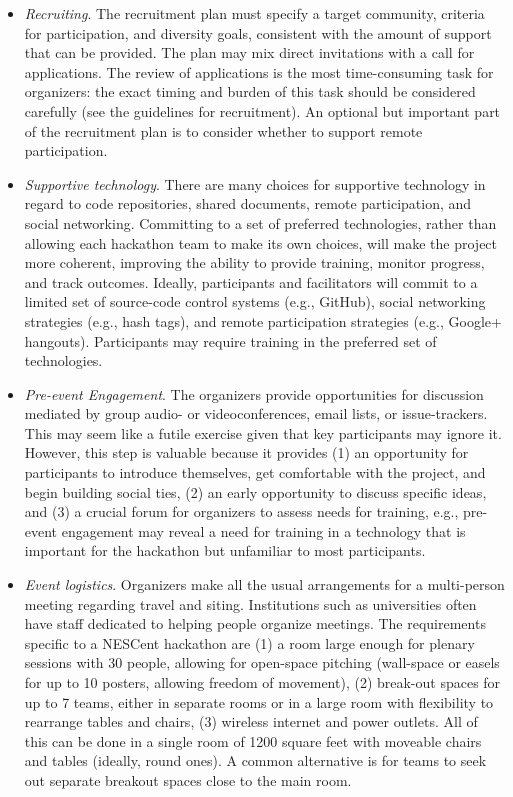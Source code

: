 \documentclass[letterpaper,11pt]{texMemo}
\begin{document}
\begin{itemize}
\begin{itemize}
\item	{\em Recruiting}. The recruitment plan must specify a target community, criteria for participation, and diversity goals, consistent with the amount of support that can be provided. The plan may mix direct invitations with a call for applications. The review of applications is the most time-consuming task for organizers: the exact timing and burden of this task should be considered carefully (see the guidelines for recruitment). An optional but important part of the recruitment plan is to consider whether to support remote participation. 
\item	{\em Supportive technology}. There are many choices for supportive technology in regard to code repositories, shared documents, remote participation, and social networking. Committing to a set of preferred technologies, rather than allowing each hackathon team to make its own choices, will make the project more coherent, improving the ability to provide training, monitor progress, and track outcomes. Ideally, participants and facilitators will commit to a limited set of source-code control systems (e.g., GitHub), social networking strategies (e.g., hash tags), and remote participation strategies (e.g., Google+ hangouts). Participants may require training in the preferred set of technologies. 
\item	{\em Pre-event Engagement}. The organizers provide opportunities for discussion mediated by group audio- or videoconferences, email lists, or issue-trackers. This may seem like a futile exercise given that key participants may ignore it.  However, this step is valuable because it provides (1) an opportunity for participants to introduce themselves, get comfortable with the project, and begin building social ties, (2) an early opportunity to discuss specific ideas, and (3) a crucial forum for organizers to assess needs for training, e.g., pre-event engagement may reveal a need for training in a technology that is important for the hackathon but unfamiliar to most participants.  
\item	{\em Event logistics}. Organizers make all the usual arrangements for a multi-person meeting regarding travel and siting. Institutions such as universities often have staff dedicated to helping people organize meetings. The requirements specific to a NESCent hackathon are (1) a room large enough for plenary sessions with 30 people, allowing for open-space pitching (wall-space or easels for up to 10 posters, allowing freedom of movement), (2) break-out spaces for up to 7 teams, either in separate rooms or in a large room with flexibility to rearrange tables and chairs, (3) wireless internet and power outlets. All of this can be done in a single room of 1200 square feet with moveable chairs and tables (ideally, round ones). A common alternative is for teams to seek out separate breakout spaces close to the main room. 

\end{itemize}
\end{itemize}
\end{document}
